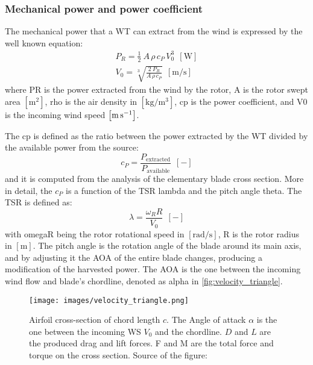 \subsubsection{Mechanical power and power coefficient}\label{subsec:mech_pow_and_pow_coeff}
The mechanical power that a \acrshort{WT} can extract from the wind is expressed by the well known equation:
\begin{gather}
    P_R = \frac{1}{2}\ A \, \rho \, c_P \, V_0^3 \ \ \left[\si{\watt}\right] \label{eq:power} \\
    V_0 = \sqrt[3]{\frac{2 \ P_R}{A \, \rho \, c_P}} \ \ \left[\si{\meter \per \second}\right] 
\end{gather}
where \acrshort{PR} is the power extracted from the wind by the rotor, \acrshort{A} is the rotor swept area $\left[\si{\square \meter}\right]$, \acrshort{rho} is the air density in $\left[\si{\kilo\gram\per\cubic\meter}\right]$, \acrshort{cp} is the power coefficient, and \acrshort{V0} is the incoming wind speed $\left[\si{\meter\per\second}\right]$.

The \acrfull{cp} is defined as the ratio between the power extracted by the \acrshort{WT} divided by the available power from the source:
\begin{equation}
    c_P = \frac{P_{\text{extracted}}}{P_{\text{available}}} \ \ \left[-\right]
    \label{eq:c_P}
\end{equation}
and it is computed from the analysis of the elementary blade cross section. More in detail, the $c_P$ is a function of the \acrfull{TSR} \acrshort{lambda} and the pitch angle \acrshort{theta}. The \acrshort{TSR} is defined as:
\begin{equation}
    \lambda = \frac{\omega_R R}{V_0} \ \ \left[-\right]
    \label{eq:TSR}
\end{equation}
with \acrshort{omegaR} being the rotor rotational speed in $\left[\si{\radian \per \second}\right]$, \acrshort{R} is the rotor radius in $\left[\si{\meter}\right]$. The pitch angle is the rotation angle of the blade around its main axis, and by adjusting it the \acrfull{AOA} of the entire blade changes, producing a modification of the harvested power. The \acrshort{AOA} is the one between the incoming wind flow and blade's chordline, denoted as \acrshort{alpha} in \autoref{fig:velocity_triangle}. 
\begin{figure}[htb]
    \centering
    \texttt{[image: images/velocity\_triangle.png]}
    \caption{Airfoil cross-section of chord length $c$. The Angle of attack $\alpha$ is the one between the incoming \acrshort{WS} $V_0$ and the chordline. $D$ and $L$ are the produced drag and lift forces. F and M are the total force and torque on the cross section. Source of the figure: \cite{Aerodynamics_of_wind_turbines}}
    \label{fig:velocity_triangle}
\end{figure}

